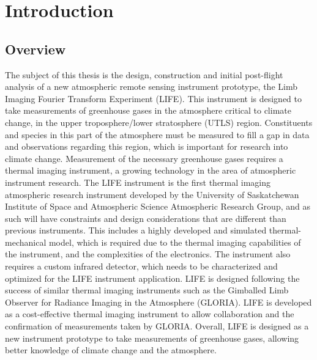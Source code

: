 \chapter{Introduction}

\section{Overview}
The subject of this thesis is the design, construction and initial post-flight analysis of a new atmospheric remote sensing instrument prototype, the Limb Imaging Fourier Transform Experiment (LIFE). This instrument is designed to take measurements of greenhouse gases in the atmosphere critical to climate change, in the upper troposphere/lower stratosphere (UTLS) region. Constituents and species in this part of the atmosphere must be measured to fill a gap in data and observations regarding this region, which is important for research into climate change. Measurement of the necessary greenhouse gases requires a thermal imaging instrument, a growing technology in the area of atmospheric instrument research. The LIFE instrument is the first thermal imaging atmospheric research instrument developed by the University of Saskatchewan Institute of Space and Atmospheric Science Atmospheric Research Group, and as such will have constraints and design considerations that are different than previous instruments. This includes a highly developed and simulated thermal-mechanical model, which is required due to the thermal imaging capabilities of the instrument, and the complexities of the electronics. The instrument also requires a custom infrared detector, which needs to be characterized and optimized for the LIFE instrument application. LIFE is designed following the success of similar thermal imaging instruments such as the Gimballed Limb Observer for Radiance Imaging in the Atmosphere (GLORIA). LIFE is developed as a cost-effective thermal imaging instrument to allow collaboration and the confirmation of measurements taken by GLORIA. Overall, LIFE is designed as a new instrument prototype to take measurements of greenhouse gases, allowing better knowledge of climate change and the atmosphere.

